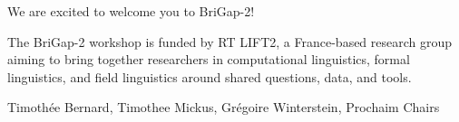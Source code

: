 We are excited to welcome you to BriGap-2!

The BriGap-2 workshop is funded by RT LIFT2, a France-based research group aiming to bring together researchers in computational linguistics, formal linguistics, and field linguistics around shared questions, data, and tools.

Timothée Bernard, Timothee Mickus, Grégoire Winterstein, Prochaim Chairs
